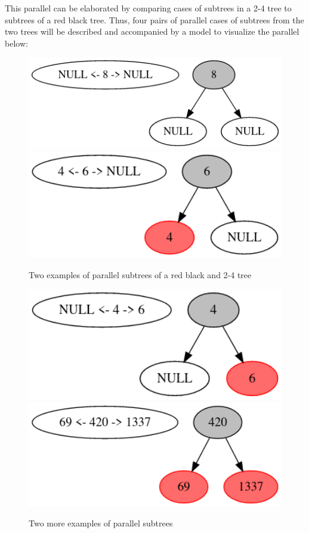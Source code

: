 \documentclass{article}
\begin{document}
\noindent
This parallel can be elaborated by comparing cases of subtrees in a  2-4 tree to subtrees of a red black tree. Thus, four pairs of parallel cases of subtrees from the two trees will be described and accompanied by a model to visualize the parallel below:
\\

\begin{figure}[h]
    \centering
    \includegraphics[width = 12cm]{8both.png}
    \includegraphics[width = 12cm]{46(both).png}
    \caption{Two examples of parallel subtrees of a red black and 2-4 tree}
\end{figure}

\begin{figure}[h]
    \centering
    \includegraphics[width = 12cm]{4right6both.png}
    \includegraphics[width = 12cm]{694201337(both).png}
    \caption{Two more examples of parallel subtrees}
\end{figure}
\end{document}

